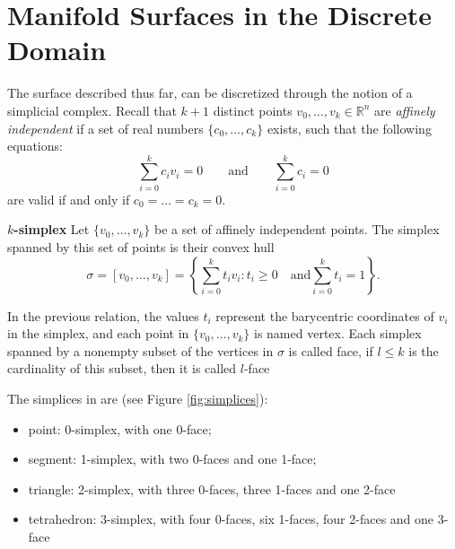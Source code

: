 
\section{Manifold Surfaces in the Discrete Domain}
The surface described thus far, can be discretized through the notion of a simplicial complex.
Recall that $k + 1$ distinct points $v_0, \dots, v_k \in \mathbb{R}^n$ are \emph{affinely independent} if a set of real numbers $\{c_0, \dots, c_k \}$ exists, such that the following equations:
\[
\sum_{i=0}^k{c_i v_i} = 0 \qquad \text{and} \qquad \sum_{i=0}^k{c_i} = 0
\]
are valid if and only if   $c_0 = \dots = c_k = 0$. 


\begin{mydef}
 \textbf{$k$-simplex}  
 Let $\{v_0, \dots, v_k\}$ be a set of affinely independent points. The simplex spanned by this set of points is their convex hull
 \[
 \sigma = [v_0, \dots, v_k] = \left\{ \sum_{i=0}^{k}{t_i v_i} : t_i \geq 0 \quad \text{and}  \sum_{i=0}^{k}{t_i} = 1\right\}.
 \]
\end{mydef}
In the previous relation, the values $t_i$ represent the barycentric coordinates of $v_i$ in the simplex, and each point in $\{v_0, \dots, v_k\}$ is named vertex.
Each simplex spanned by a nonempty subset of the vertices in $\sigma$ is called face, if $l\leq k$ is the cardinality of this subset, then it is called $l$-face

The simplices in \Rthree are (see Figure \ref{fig:simplices}):
\begin{itemize}
  \item point: 0-simplex, with one 0-face;
  \item segment: 1-simplex, with two 0-faces and one 1-face;
  \item triangle: 2-simplex, with three 0-faces, three 1-faces and one 2-face
  \item tetrahedron: 3-simplex, with four 0-faces, six 1-faces, four 2-faces and one 3-face
\end{itemize}

